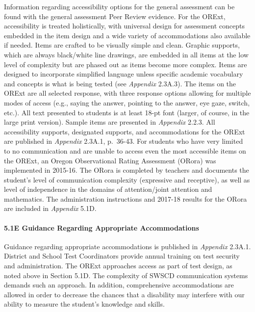 \documentclass[]{article}
\let\oldparagraph\paragraph
\renewcommand{\paragraph}[1]{\oldparagraph{#1}\mbox{}}
\begin{document}
Information regarding accessibility options for the general assessment
can be found with the general assessment Peer Review evidence. For the
ORExt, accessibility is treated holistically, with universal design for
assessment concepts embedded in the item design and a wide variety of
accommodations also available if needed. Items are crafted to be
visually simple and clean. Graphic supports, which are always
black/white line drawings, are embedded in all items at the low level of
complexity but are phased out as items become more complex. Items are
designed to incorporate simplified language unless specific academic
vocabulary and concepts is what is being tested (see \emph{Appendix}
2.3A.3). The items on the ORExt are all selected response, with three
response options allowing for multiple modes of access (e.g., saying the
answer, pointing to the answer, eye gaze, switch, etc.). All text
presented to students is at least 18-pt font (larger, of course, in the
large print version). Sample items are presented in \emph{Appendix}
2.2.3. All accessibility supports, designated supports, and
accommodations for the ORExt are published in \emph{Appendix} 2.3A.1,
p.~36-43. For students who have very limited to no communication and are
unable to access even the most accessible items on the ORExt, an Oregon
Observational Rating Assessment (ORora) was implemented in 2015-16. The
ORora is completed by teachers and documents the student's level of
communication complexity (expressive and receptive), as well as level of
independence in the domains of attention/joint attention and
mathematics. The administration instructions and 2017-18 results for the
ORora are included in \emph{Appendix} 5.1D.

\paragraph{5.1E Guidance Regarding Appropriate
Accommodations}\label{e-guidance-regarding-appropriate-accommodations}

Guidance regarding appropriate accommodations is published in
\emph{Appendix} 2.3A.1. District and School Test Coordinators provide
annual training on test security and administration. The ORExt
approaches access as part of test design, as noted above in Section
5.1D. The complexity of SWSCD communication systems demands such an
approach. In addition, comprehensive accommodations are allowed in order
to decrease the chances that a disability may interfere with our ability
to measure the student's knowledge and skills.
\end{document}
